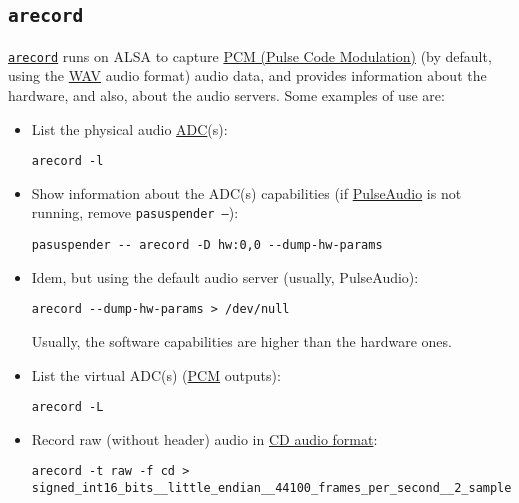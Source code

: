 \subsection{\texttt{arecord}}
\texttt{\href{https://linux.die.net/man/1/arecord}{arecord}} runs on
ALSA to capture
\href{https://en.wikipedia.org/wiki/Pulse-code_modulation}{PCM (Pulse
  Code Modulation)} (by default, using the
\href{https://en.wikipedia.org/wiki/WAV}{WAV} audio format) audio
data, and provides information about the hardware, and also, about the
audio servers. Some examples of use are:

\begin{itemize}

\item List the physical audio \href{https://en.wikipedia.org/wiki/Analog-to-digital_converter}{ADC}(s):
\begin{verbatim}
arecord -l      
\end{verbatim}

\item Show information about the ADC(s) capabilities (if \href{https://www.freedesktop.org/wiki/Software/PulseAudio/}{PulseAudio} is not running, remove \texttt{pasuspender --}):
\begin{verbatim}
pasuspender -- arecord -D hw:0,0 --dump-hw-params
\end{verbatim}

\item Idem, but using the default audio server (usually, PulseAudio):
\begin{verbatim}
arecord --dump-hw-params > /dev/null
\end{verbatim}
Usually, the software capabilities are higher than the hardware ones.

\item List the virtual ADC(s) (\href{https://alsa.opensrc.org/Pcm-device}{PCM} outputs):
\begin{verbatim}
arecord -L
\end{verbatim}

\item Record raw (without header) audio in \href{https://en.wikipedia.org/wiki/Compact_Disc_Digital_Audio#Audio_format}{CD audio format}:
\begin{verbatim}
arecord -t raw -f cd > signed_int16_bits__little_endian__44100_frames_per_second__2_samples_per_frame.raw
\end{verbatim}

\end{itemize}

